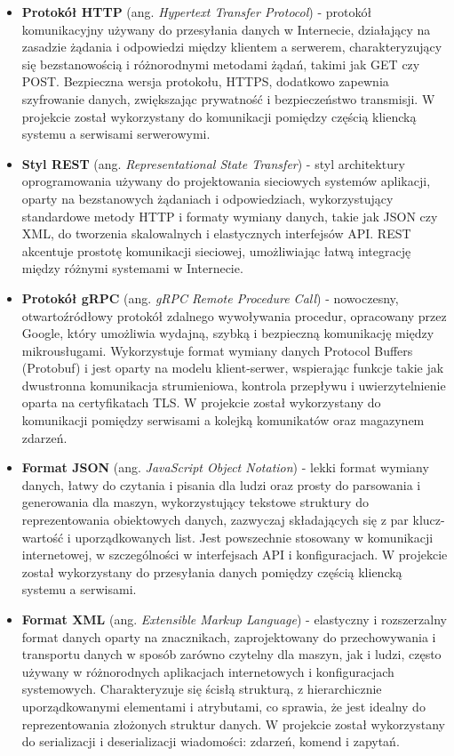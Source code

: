 \begin{itemize}

    \item \textbf{Protokół HTTP} (ang. \textit{Hypertext Transfer Protocol}) - protokół komunikacyjny używany do przesyłania danych w Internecie, działający na zasadzie żądania i odpowiedzi między klientem a serwerem, charakteryzujący się bezstanowością i różnorodnymi metodami żądań, takimi jak GET czy POST. Bezpieczna wersja protokołu, HTTPS, dodatkowo zapewnia szyfrowanie danych, zwiększając prywatność i bezpieczeństwo transmisji. W projekcie został wykorzystany do komunikacji pomiędzy częścią kliencką systemu a serwisami serwerowymi.

    \item \textbf{Styl REST} (ang. \textit{Representational State Transfer}) - styl architektury oprogramowania używany do projektowania sieciowych systemów aplikacji, oparty na bezstanowych żądaniach i odpowiedziach, wykorzystujący standardowe metody HTTP i formaty wymiany danych, takie jak JSON czy XML, do tworzenia skalowalnych i elastycznych interfejsów API. REST akcentuje prostotę komunikacji sieciowej, umożliwiając łatwą integrację między różnymi systemami w Internecie.
    
    \item \textbf{Protokół gRPC} (ang. \textit{gRPC Remote Procedure Call}) - nowoczesny, otwartoźródłowy protokół zdalnego wywoływania procedur, opracowany przez Google, który umożliwia wydajną, szybką i bezpieczną komunikację między mikrousługami. Wykorzystuje format wymiany danych Protocol Buffers (Protobuf) i jest oparty na modelu klient-serwer, wspierając funkcje takie jak dwustronna komunikacja strumieniowa, kontrola przepływu i uwierzytelnienie oparta na certyfikatach TLS. W projekcie został wykorzystany do komunikacji pomiędzy serwisami a kolejką komunikatów oraz magazynem zdarzeń.

    \item \textbf{Format JSON} (ang. \textit{JavaScript Object Notation}) - lekki format wymiany danych, łatwy do czytania i pisania dla ludzi oraz prosty do parsowania i generowania dla maszyn, wykorzystujący tekstowe struktury do reprezentowania obiektowych danych, zazwyczaj składających się z par klucz-wartość i uporządkowanych list. Jest powszechnie stosowany w komunikacji internetowej, w szczególności w interfejsach API i konfiguracjach. W projekcie został wykorzystany do przesyłania danych pomiędzy częścią kliencką systemu a serwisami.
    
    \item \textbf{Format XML} (ang. \textit{Extensible Markup Language}) - elastyczny i rozszerzalny format danych oparty na znacznikach, zaprojektowany do przechowywania i transportu danych w sposób zarówno czytelny dla maszyn, jak i ludzi, często używany w różnorodnych aplikacjach internetowych i konfiguracjach systemowych. Charakteryzuje się ścisłą strukturą, z hierarchicznie uporządkowanymi elementami i atrybutami, co sprawia, że jest idealny do reprezentowania złożonych struktur danych. W projekcie został wykorzystany do serializacji i deserializacji wiadomości: zdarzeń, komend i zapytań.

\end{itemize}

